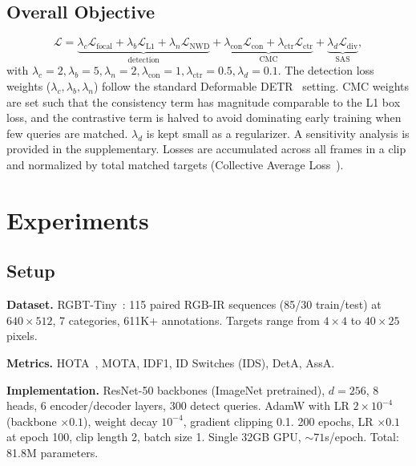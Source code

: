 \documentclass[10pt,twocolumn,letterpaper]{article}
\begin{document}
\subsection{Overall Objective}

\begin{equation}
\mathcal{L} = \underbrace{\lambda_c\mathcal{L}_\text{focal} + \lambda_b\mathcal{L}_\text{L1} + \lambda_n\mathcal{L}_\text{NWD}}_{\text{detection}} + \underbrace{\lambda_\text{con}\mathcal{L}_\text{con} + \lambda_\text{ctr}\mathcal{L}_\text{ctr}}_{\text{CMC}} + \underbrace{\lambda_d\mathcal{L}_\text{div}}_{\text{SAS}},
\end{equation}
with $\lambda_c\!=\!2,\lambda_b\!=\!5,\lambda_n\!=\!2,\lambda_\text{con}\!=\!1,\lambda_\text{ctr}\!=\!0.5,\lambda_d\!=\!0.1$.
The detection loss weights ($\lambda_c,\lambda_b,\lambda_n$) follow the standard Deformable DETR~\cite{deformable_detr} setting.
CMC weights are set such that the consistency term has magnitude comparable to the L1 box loss, and the contrastive term is halved to avoid dominating early training when few queries are matched.
$\lambda_d$ is kept small as a regularizer.
A sensitivity analysis is provided in the supplementary.
Losses are accumulated across all frames in a clip and normalized by total matched targets (Collective Average Loss~\cite{motr}).

\section{Experiments}
\label{sec:exp}

\subsection{Setup}

\textbf{Dataset.}
RGBT-Tiny~\cite{rgbt_tiny}: 115 paired RGB-IR sequences (85/30 train/test) at $640\!\times\!512$, 7 categories, 611K+ annotations.
Targets range from $4\!\times\!4$ to $40\!\times\!25$ pixels.

\textbf{Metrics.}
HOTA~\cite{hota}, MOTA, IDF1, ID Switches (IDS), DetA, AssA.

\textbf{Implementation.}
ResNet-50 backbones (ImageNet pretrained), $d\!=\!256$, 8 heads, 6 encoder/decoder layers, 300 detect queries.
AdamW with LR $2\!\times\!10^{-4}$ (backbone $\times\!0.1$), weight decay $10^{-4}$, gradient clipping 0.1.
200 epochs, LR $\times\!0.1$ at epoch 100, clip length 2, batch size 1.
Single 32GB GPU, ${\sim}71$s/epoch. Total: 81.8M parameters.
\end{document}
